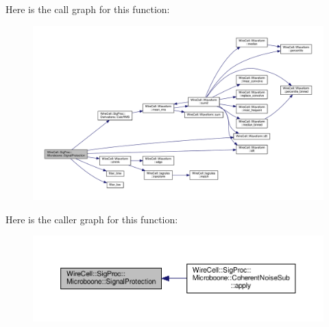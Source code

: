 Here is the call graph for this function\+:
\nopagebreak
\begin{figure}[H]
\begin{center}
\leavevmode
\includegraphics[width=350pt]{namespace_wire_cell_1_1_sig_proc_1_1_microboone_a3502d22dc7280eeea95f3a2f2d52891c_cgraph}
\end{center}
\end{figure}
Here is the caller graph for this function\+:
\nopagebreak
\begin{figure}[H]
\begin{center}
\leavevmode
\includegraphics[width=350pt]{namespace_wire_cell_1_1_sig_proc_1_1_microboone_a3502d22dc7280eeea95f3a2f2d52891c_icgraph}
\end{center}
\end{figure}
\mbox{\label{namespace_wire_cell_1_1_sig_proc_1_1_microboone_a06023d4f9428b8e2f9ce469d3bacb7b4}} 
